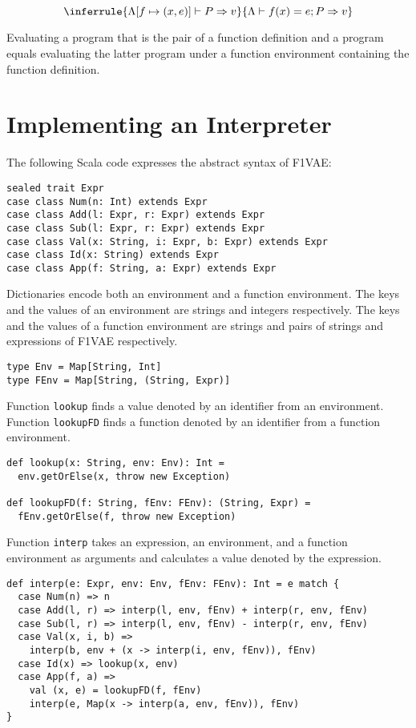 \[
\inferrule
{ \Lambda\lbrack f\mapsto(x,e)\rbrack\vdash P\Rightarrow v }
{ \Lambda\vdash f(x)=e;P\Rightarrow v }
\]

Evaluating a program that is the pair of a function definition and a program
equals evaluating the latter program under a function environment containing the
function definition.

\section{Implementing an Interpreter}

The following Scala code expresses the abstract syntax of F1VAE:

\begin{verbatim}
sealed trait Expr
case class Num(n: Int) extends Expr
case class Add(l: Expr, r: Expr) extends Expr
case class Sub(l: Expr, r: Expr) extends Expr
case class Val(x: String, i: Expr, b: Expr) extends Expr
case class Id(x: String) extends Expr
case class App(f: String, a: Expr) extends Expr
\end{verbatim}

Dictionaries encode both an environment and a function environment. The keys and
the values of an environment are strings and integers respectively. The keys and
the values of a function environment are strings and pairs of strings and
expressions of F1VAE respectively.

\begin{verbatim}
type Env = Map[String, Int]
type FEnv = Map[String, (String, Expr)]
\end{verbatim}

Function \verb!lookup! finds a value denoted by an identifier from an
environment. Function \verb!lookupFD! finds a function denoted by an identifier
from a function environment.

\begin{verbatim}
def lookup(x: String, env: Env): Int =
  env.getOrElse(x, throw new Exception)

def lookupFD(f: String, fEnv: FEnv): (String, Expr) =
  fEnv.getOrElse(f, throw new Exception)
\end{verbatim}

Function \verb!interp! takes an expression, an environment, and a function
environment as arguments and calculates a value denoted by the expression.

\begin{verbatim}
def interp(e: Expr, env: Env, fEnv: FEnv): Int = e match {
  case Num(n) => n
  case Add(l, r) => interp(l, env, fEnv) + interp(r, env, fEnv)
  case Sub(l, r) => interp(l, env, fEnv) - interp(r, env, fEnv)
  case Val(x, i, b) =>
    interp(b, env + (x -> interp(i, env, fEnv)), fEnv)
  case Id(x) => lookup(x, env)
  case App(f, a) =>
    val (x, e) = lookupFD(f, fEnv)
    interp(e, Map(x -> interp(a, env, fEnv)), fEnv)
}
\end{verbatim}

